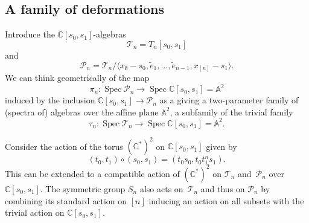 \documentclass[a4paper,11pt]{amsart}
\theoremstyle{plain}
\theoremstyle{definition}
\newcommand{\A}{\mathbb{A}}
\newcommand{\C}{\mathbb{C}}
\newcommand{\CP}{\mathscr{P}}
\newcommand{\CT}{\mathcal{T}} %
\newcommand{\pa}{T} %
\newcommand{\te}{\widetilde{e}}
\DeclareMathOperator{\Spec}{Spec}
\begin{document}
\subsection{A family of deformations}\label{sec:def}

Introduce the $\C[s_0, s_1]$-algebras
\[ \CT_n = \pa_n[s_0, s_1]\]
and
\[ \CP_n = \CT_n/\langle x_{\scriptscriptstyle\emptyset} - s_0, \te_1, \ldots, \te_{n-1}, x_{\scriptscriptstyle [n]}-s_1\rangle. 
\]
We can think geometrically of the map \[\pi_n\colon \Spec\CP_n\to \Spec\C[s_0, s_1]=\A^2\] induced by the inclusion $\C[s_0, s_1]\rightarrow \CP_n$ as a giving a two-parameter family of (spectra of) algebras over the affine plane $\A^2$, a subfamily of the trivial family 
\[\tau_n\colon \Spec\CT_n\to \Spec\C[s_0, s_1]=\A^2.\] 

Consider the action of the torus $(\C^*)^2$ on $\C[s_0, s_1]$ given by 
\[ (t_0, t_1) \circ (s_0, s_1) = (t_0 s_0, t_0 t_1^n s_1). 
\]
This can be extended to a compatible action of $(\C^*)^2$ on $\CT_n$ and~$\CP_n$ over $\C[s_0, s_1]$. 
The symmetric group $S_n$ also acts on~$\CT_n$ and thus on $\CP_n$ by combining its standard action on $[n]$ inducing an action on all subsets with the trivial action on $\C[s_0, s_1]$.
\end{document}
